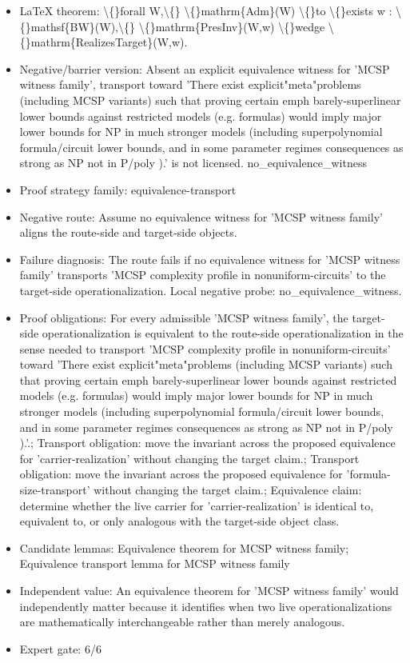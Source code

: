 \documentclass[11pt]{article}
\begin{document}
\begin{itemize}
\item LaTeX theorem: \textbackslash\{\}forall W,\textbackslash\{\} \textbackslash\{\}mathrm\{Adm\}(W) \textbackslash\{\}to \textbackslash\{\}exists w : \textbackslash\{\}mathsf\{BW\}(W),\textbackslash\{\} \textbackslash\{\}mathrm\{PresInv\}(W,w) \textbackslash\{\}wedge \textbackslash\{\}mathrm\{RealizesTarget\}(W,w).
\item Negative/barrier version: Absent an explicit equivalence witness for 'MCSP witness family', transport toward 'There exist explicit"meta"problems (including MCSP variants) such that proving certain emph barely-superlinear lower bounds against restricted models (e.g. formulas) would imply major lower bounds for NP in much stronger models (including superpolynomial formula/circuit lower bounds, and in some parameter regimes consequences as strong as NP not in P/poly ).' is not licensed. no\_equivalence\_witness
\item Proof strategy family: equivalence-transport
\item Negative route: Assume no equivalence witness for 'MCSP witness family' aligns the route-side and target-side objects.
\item Failure diagnosis: The route fails if no equivalence witness for 'MCSP witness family' transports 'MCSP complexity profile in nonuniform-circuits' to the target-side operationalization. Local negative probe: no\_equivalence\_witness.
\item Proof obligations: For every admissible 'MCSP witness family', the target-side operationalization is equivalent to the route-side operationalization in the sense needed to transport 'MCSP complexity profile in nonuniform-circuits' toward 'There exist explicit"meta"problems (including MCSP variants) such that proving certain emph barely-superlinear lower bounds against restricted models (e.g. formulas) would imply major lower bounds for NP in much stronger models (including superpolynomial formula/circuit lower bounds, and in some parameter regimes consequences as strong as NP not in P/poly ).'.; Transport obligation: move the invariant across the proposed equivalence for 'carrier-realization' without changing the target claim.; Transport obligation: move the invariant across the proposed equivalence for 'formula-size-transport' without changing the target claim.; Equivalence claim: determine whether the live carrier for 'carrier-realization' is identical to, equivalent to, or only analogous with the target-side object class.
\item Candidate lemmas: Equivalence theorem for MCSP witness family; Equivalence transport lemma for MCSP witness family
\item Independent value: An equivalence theorem for 'MCSP witness family' would independently matter because it identifies when two live operationalizations are mathematically interchangeable rather than merely analogous.
\item Expert gate: 6/6
\end{itemize}
\end{document}
